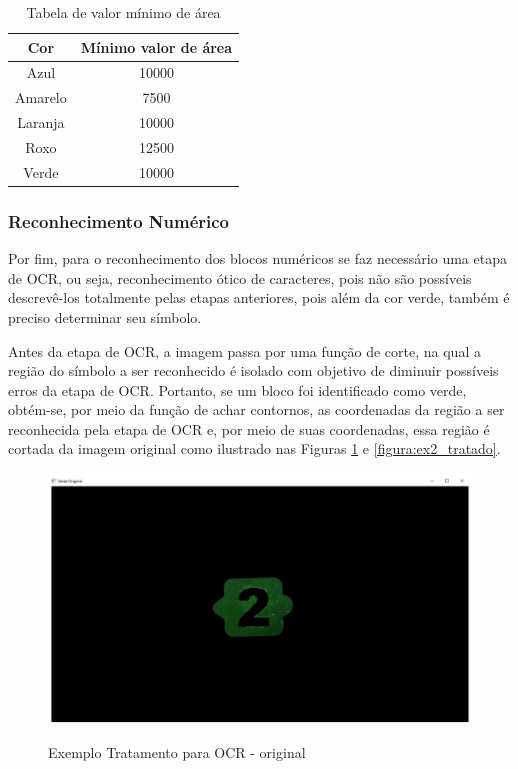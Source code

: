     \begin{table}[H]
        \centering
        \caption{Tabela de valor mínimo de área}
        \label{table:area_values}
        \begin{tabular}{ |c|c| } 
         \hline
        Cor     & Mínimo valor de área \\
         \hline
        Azul    & 10000                \\
         \hline
        Amarelo & 7500                 \\
         \hline
        Laranja & 10000                \\
         \hline
        Roxo    & 12500                \\
         \hline
        Verde   & 10000                \\    [0.5ex]    
         \hline
        
        \end{tabular}
        
    \end{table}
    
        
    \subsubsection{Reconhecimento Numérico}
    Por fim, para o reconhecimento dos blocos numéricos se faz necessário uma etapa de OCR, ou seja, reconhecimento ótico de caracteres, pois não são possíveis descrevê-los totalmente pelas etapas anteriores, pois além da cor verde, também é preciso determinar seu símbolo.
    
    Antes da etapa de OCR, a imagem passa por uma função de corte, na qual a região do símbolo a ser reconhecido é isolado com objetivo de diminuir possíveis erros da etapa de OCR. Portanto, se um bloco foi identificado como verde, obtém-se, por meio da função de achar contornos,  as coordenadas da região a ser reconhecida pela etapa de OCR e, por meio de suas coordenadas, essa região é cortada da imagem original como ilustrado nas Figuras \ref{figura:ex2_original} e \ref{figura:ex2_tratado}.
    
    \begin{figure}[H]
        \caption{Exemplo Tratamento para OCR - original}
        \centering
        \includegraphics[width=14cm]{Imagens/Cap4/ex2_original.PNG}
        \label{figura:ex2_original}
    \end{figure}
    
